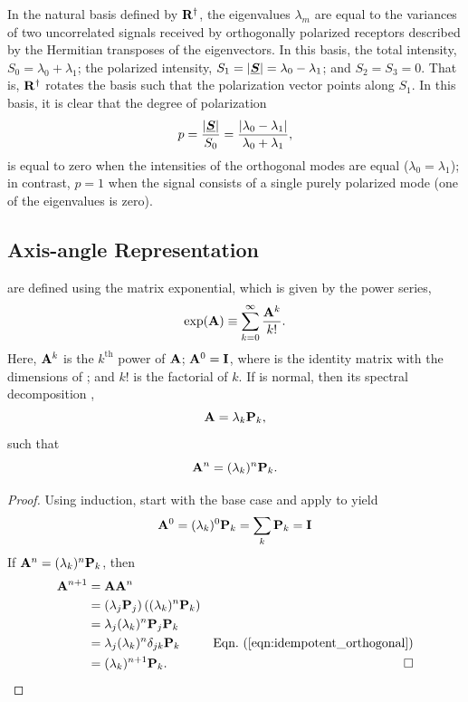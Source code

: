 In the natural basis defined by ${\bf{R}}^\dagger$, the eigenvalues
$\lambda_m$ are equal to the variances of two uncorrelated signals
received by orthogonally polarized receptors described by
the Hermitian transposes of the eigenvectors.  In this basis,
%
the total intensity, $S_0=\lambda_0+\lambda_1$; the
polarized intensity, $S_1=|\underline{\mbox{\boldmath $S$}}|=\lambda_0-\lambda_1$; and
$S_2=S_3=0$.
%
That is, ${\bf{R}}^\dagger$ rotates the basis such that the
polarization vector points along $S_1$.  In this basis, it is clear that the degree of polarization
%
\begin{equation}
\label{eqn:degree_of_polarization_eigen}
p = \frac{|\underline{\mbox{\boldmath $S$}}|}{S_0} = \frac{|\lambda_0-\lambda_1|}{\lambda_0+\lambda_1},
\end{equation}
%
is equal to zero when the intensities of the orthogonal modes are equal ($\lambda_0 = \lambda_1$);
in contrast, $p=1$ when the signal consists of a single purely polarized mode (one of the eigenvalues is zero).

\subsection{Axis-angle Representation}
\label{app:fundamental_transformations}

 are defined using the matrix exponential, which is given by the power series,
%
\begin{equation}
    \exp({\bf A}) \equiv \sum_{k=0}^\infty \frac{{\bf A}^k}{k!}.
    \label{eqn:matrix_exponential}
\end{equation}
%
Here, ${\bf A}^k$ is the $k^\mathrm{th}$ power of ${\bf A}$; 
${\bf A}^0 = {\bf I}$, where  is the identity matrix with the dimensions of ;
and $k!$ is the factorial of $k$.
%
%
If  is normal, then its spectral decomposition
,
\begin{equation}
    {\bf A} = \lambda_k {\bf P}_k,
\end{equation}
such that
\begin{equation}
    {\bf A}^n = (\lambda_k)^n {\bf P}_k.
    \label{eqn:matrix_power}
\end{equation}

\begin{proof}
Using induction, start with the base case and apply  to yield
\begin{align*}
{\bf A}^0 = (\lambda_k)^0 {\bf P}_k = \sum_k {\bf P}_k = {\bf I}
\end{align*}
If ${\bf A}^n = (\lambda_k)^n {\bf P}_k$, then
\begin{align*}
\JM{A}^{n+1} &= \JM{A}\JM{A}^n \\
&= \left( \lambda_j \JM{P}_j \right) \left( (\lambda_k)^n \JM{P}_k \right)  \\
&= \lambda_j (\lambda_k)^n \JM{P}_j \JM{P}_k   \\
&= \lambda_j (\lambda_k)^n \delta_{jk} \JM{P}_k & \peqn{idempotent_orthogonal} \\
&= (\lambda_k)^{n+1} \JM{P}_k. & \hfill \square
\end{align*}
%
\end{proof}

